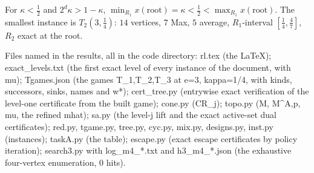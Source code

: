 \begin{corollary}\label{rl:tree-threshold}
For $\kappa<\tfrac12$ and $2^{d}\kappa>1-\kappa$, $\min_{R_1}x(\mathrm{root})=\kappa<\tfrac12<\max_{R_1}x(\mathrm{root})$. The smallest instance is $T_2(3,\tfrac14)$: $14$ vertices, $7$ Max, $5$ average, $R_1$-interval $[\tfrac14,\tfrac47]$, $R_2$ exact at the root.
\end{corollary}

Files named in the results, all in the code directory: rl.tex (the LaTeX); exact_levels.txt (the first exact level of every instance of the document, with mu); Tgames.json (the games T_1,T_2,T_3 at e=3, kappa=1/4, with kinds, successors, sinks, names and w*); cert_tree.py (entrywise exact verification of the level-one certificate from the built game); cone.py (CR_j); topo.py (M, M^{A,p}, mu, the refined mhat); sa.py (the level-j lift and the exact active-set dual certificates); red.py, tgame.py, tree.py, cyc.py, mix.py, designs.py, inst.py (instances); taskA.py (the table); escape.py (exact escape certificates by policy iteration); search3.py with log_m4_*.txt and h3_m4_*.json (the exhaustive four-vertex enumeration, 0 hits).